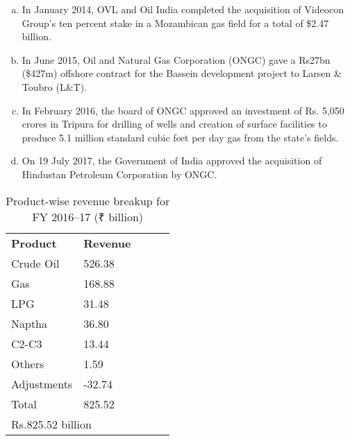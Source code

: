 \begin{enumerate}
\begin{enumerate}[(a)]
\item In January 2014, OVL and Oil India completed the acquisition of Videocon Group's ten percent stake in a Mozambican gas field for a total of \$2.47 billion.

\item In June 2015, Oil and Natural Gas Corporation (ONGC) gave a Rs27bn (\$427m) offshore contract for the Bassein development project to Larsen \& Toubro (L\&T).

\item In February 2016, the board of ONGC approved an investment of Rs. 5,050 crores in Tripura for drilling of wells and creation of surface facilities to produce 5.1 million standard cubic feet per day gas from the state's fields.

\item On 19 July 2017, the Government of India approved the acquisition of Hindustan Petroleum Corporation by ONGC.

\end{enumerate}


\end{enumerate}


\begin{table}[H]

\centering

\begin{tabular}{|l|l|lll}
\cline{1-2} 
\textbf{Product}     & \textbf{Revenue} &  &  &  \\ \cline{1-2}
Crude Oil            & 526.38           &  &  &  \\ \cline{1-2}
Gas                  & 168.88           &  &  &  \\ \cline{1-2}
LPG                  & 31.48            &  &  &  \\ \cline{1-2}
Naptha               & 36.80            &  &  &  \\ \cline{1-2}
C2-C3                & 13.44            &  &  &  \\ \cline{1-2}
Others               & 1.59             &  &  &  \\ \cline{1-2}
Adjustments          & -32.74           &  &  &  \\ \cline{1-2}
Total                & 825.52           &  &  &  \\ \cline{1-2}
\multicolumn{2}{|l|}{Rs.825.52 billion} &  &  &  \\ \cline{1-2}
\end{tabular}

\caption{Product-wise revenue breakup for FY 2016–17 (₹ billion)}
\end{table}


